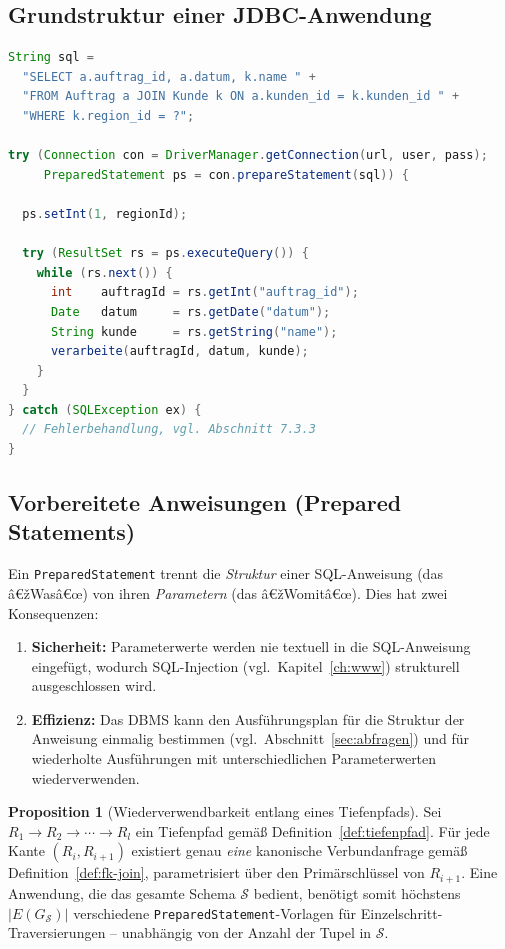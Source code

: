 ﻿\documentclass[a4paper,12pt]{report}
\theoremstyle{definition}
\newtheorem{proposition}[theorem]{Proposition}
\theoremstyle{remark}
\begin{document}
\subsection{Grundstruktur einer JDBC-Anwendung}

\begin{lstlisting}[language=Java]
String sql =
  "SELECT a.auftrag_id, a.datum, k.name " +
  "FROM Auftrag a JOIN Kunde k ON a.kunden_id = k.kunden_id " +
  "WHERE k.region_id = ?";

try (Connection con = DriverManager.getConnection(url, user, pass);
     PreparedStatement ps = con.prepareStatement(sql)) {

  ps.setInt(1, regionId);

  try (ResultSet rs = ps.executeQuery()) {
    while (rs.next()) {
      int    auftragId = rs.getInt("auftrag_id");
      Date   datum     = rs.getDate("datum");
      String kunde     = rs.getString("name");
      verarbeite(auftragId, datum, kunde);
    }
  }
} catch (SQLException ex) {
  // Fehlerbehandlung, vgl. Abschnitt 7.3.3
}
\end{lstlisting}

\subsection{Vorbereitete Anweisungen (Prepared Statements)}
\label{sec:prepared-statements}

Ein \texttt{PreparedStatement} trennt die \emph{Struktur} einer
SQL-Anweisung (das â€žWasâ€œ) von ihren \emph{Parametern} (das â€žWomitâ€œ).
Dies hat zwei Konsequenzen:

\begin{enumerate}
  \item \textbf{Sicherheit:} Parameterwerte werden nie textuell in die
    SQL-Anweisung eingefügt, wodurch SQL-Injection (vgl.\
    Kapitel~\ref{ch:www}) strukturell ausgeschlossen wird.
  \item \textbf{Effizienz:} Das DBMS kann den Ausführungsplan für die
    Struktur der Anweisung einmalig bestimmen (vgl.\
    Abschnitt~\ref{sec:abfragen}) und für wiederholte Ausführungen mit
    unterschiedlichen Parameterwerten wiederverwenden.
\end{enumerate}

\begin{proposition}[Wiederverwendbarkeit entlang eines Tiefenpfads]
\label{prop:prepared-pfad}
Sei $R_1 \to R_2 \to \cdots \to R_l$ ein Tiefenpfad gemäß
Definition~\ref{def:tiefenpfad}. Für jede Kante $(R_i,R_{i+1})$ existiert
genau \emph{eine} kanonische Verbundanfrage gemäß
Definition~\ref{def:fk-join}, parametrisiert über den Primärschlüssel
von $R_{i+1}$. Eine Anwendung, die das gesamte Schema $\mathcal{S}$
bedient, benötigt somit höchstens $|E(G_{\mathcal{S}})|$ verschiedene
\texttt{PreparedStatement}-Vorlagen für Einzelschritt-Traversierungen --
unabhängig von der Anzahl der Tupel in $\mathcal{S}$.
\end{proposition}
\end{document}
